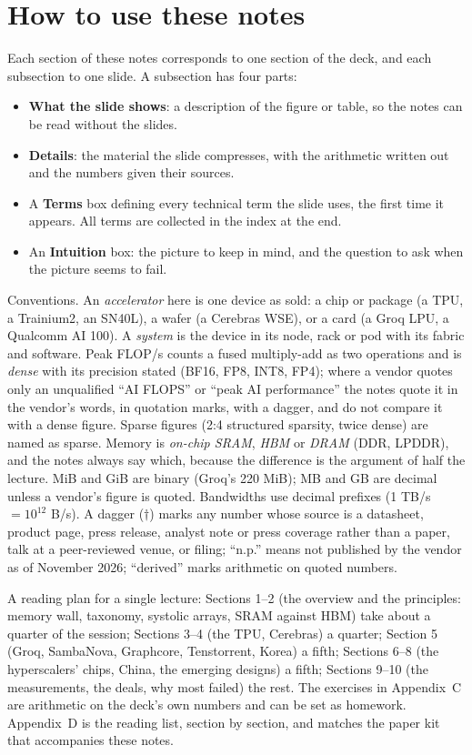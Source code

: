 \documentclass[11pt,letterpaper]{article}
\newcommand{\setstage}[1]{\colorlet{stagec}{#1}}
\begin{document}
\tableofcontents
\clearpage

\section*{How to use these notes}
Each section of these notes corresponds to one section of the deck, and each subsection to one slide. A subsection has four parts:
\begin{itemize}
  \item \textbf{What the slide shows}: a description of the figure or table, so the notes can be read without the slides.
  \item \textbf{Details}: the material the slide compresses, with the arithmetic written out and the numbers given their sources.
  \item A \textbf{Terms} box defining every technical term the slide uses, the first time it appears. All terms are collected in the index at the end.
  \item An \textbf{Intuition} box: the picture to keep in mind, and the question to ask when the picture seems to fail.
\end{itemize}
Conventions. An \emph{accelerator} here is one device as sold: a chip or package (a TPU, a Trainium2, an SN40L), a wafer (a Cerebras WSE), or a card (a Groq LPU, a Qualcomm AI 100). A \emph{system} is the device in its node, rack or pod with its fabric and software. Peak FLOP/s counts a fused multiply-add as two operations and is \emph{dense} with its precision stated (BF16, FP8, INT8, FP4); where a vendor quotes only an unqualified ``AI FLOPS'' or ``peak AI performance'' the notes quote it in the vendor's words, in quotation marks, with a dagger, and do not compare it with a dense figure. Sparse figures (2:4 structured sparsity, twice dense) are named as sparse. Memory is \emph{on-chip SRAM}, \emph{HBM} or \emph{DRAM} (DDR, LPDDR), and the notes always say which, because the difference is the argument of half the lecture. MiB and GiB are binary (Groq's 220 MiB); MB and GB are decimal unless a vendor's figure is quoted. Bandwidths use decimal prefixes (1 TB/s $=10^{12}$ B/s). A dagger ($\dagger$) marks any number whose source is a datasheet, product page, press release, analyst note or press coverage rather than a paper, talk at a peer-reviewed venue, or filing; ``n.p.'' means not published by the vendor as of November 2026; ``derived'' marks arithmetic on quoted numbers.

A reading plan for a single lecture: Sections 1--2 (the overview and the principles: memory wall, taxonomy, systolic arrays, SRAM against HBM) take about a quarter of the session; Sections 3--4 (the TPU, Cerebras) a quarter; Section 5 (Groq, SambaNova, Graphcore, Tenstorrent, Korea) a fifth; Sections 6--8 (the hyperscalers' chips, China, the emerging designs) a fifth; Sections 9--10 (the measurements, the deals, why most failed) the rest. The exercises in Appendix~C are arithmetic on the deck's own numbers and can be set as homework. Appendix~D is the reading list, section by section, and matches the paper kit that accompanies these notes.
\setstage{ink}
\end{document}
